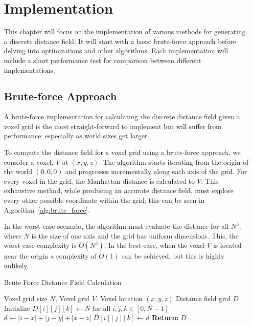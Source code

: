 \chapter{Implementation}
This chapter will focus on the implementation of various methods for generating a discrete distance field. It will start
with a basic brute-force approach before delving into optimizations and other algorithms. Each implementation will
include a short performance test for comparison between different implementations.

\section{Brute-force Approach}
A brute-force implementation for calculating the discrete distance field given a voxel grid is the most straight-forward
to implement but will suffer from performance; especially as world sizes get larger.

To compute the distance field for a voxel grid using a brute-force approach, we consider a voxel, \(V\) at \((x, y, z)\). The
algorithm starts iterating from the origin of the world \((0, 0, 0)\) and progresses incrementally along each axis of
the grid. For every voxel in the grid, the Manhattan distance is calculated to \(V\). This exhaustive method, while
producing an accurate distance field, must explore every other possible coordinate within the grid; this can be seen in
Algorithm~\ref{alg:brute_force}.

In the worst-case scenario, the algorithm must evaluate the distance for all \(N^3\), where \(N\) is the size of one
axis and the grid has uniform dimensions. This, the worst-case complexity is \(O(N^3)\). In the best-case, when the
voxel \(V\) is located near the origin a complexity of \(O(1)\) can be achieved, but this is highly unlikely.

\begin{algorithm}
    \caption{Brute Force Distance Field Calculation}
    \label{alg:brute_force}
    \begin{algorithmic}[1]
        \REQUIRE Voxel grid size \(N\), Voxel grid \(V\), Voxel location \((x, y, z)\)
        \ENSURE Distance field grid \(D\)
        \STATE Initialize \(D[i][j][k] \gets N\) for all \(i, j, k \in [0, N-1]\)
        \STATE \(d \gets |i - x| + |j - y| + |x - z|\) 
        \STATE \(D[i][j][k] \gets d\) 
        \ENDIF
        \ENDIF
        \ENDFOR
        \ENDFOR
        \ENDFOR
        \STATE \textbf{Return:} \(D\)
    \end{algorithmic}
\end{algorithm}

